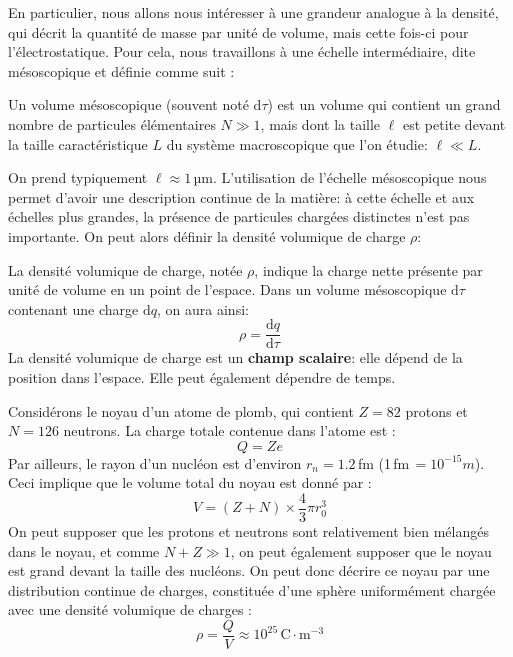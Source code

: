 \documentclass[11pt,fleqn]{book} %
\begin{document}
En particulier, nous allons nous intéresser à une grandeur analogue à la densité, qui décrit la quantité de masse par unité de volume, mais cette fois-ci pour l'électrostatique. Pour cela, nous travaillons à une échelle intermédiaire, dite mésoscopique et définie comme suit :

\begin{definition}
    Un volume mésoscopique (souvent noté $\mathrm{d}\tau$) est un volume qui contient un grand nombre de particules élémentaires $N \gg 1$, mais dont la taille $\ell$ est petite devant la taille caractéristique $L$ du système macroscopique que l'on étudie: $\ell \ll L$. 
\end{definition}

On prend typiquement $\ell \approx 1$\,µm. L'utilisation de l'échelle mésoscopique nous permet d'avoir une description continue de la matière: à cette échelle et aux échelles plus grandes, la présence de particules chargées distinctes n'est pas importante. On peut alors définir la densité volumique de charge $\rho$:

\begin{definition}
    La densité volumique de charge, notée $\rho$, indique la charge nette présente par unité de volume en un point de l'espace. Dans un volume mésoscopique $\mathrm{d}\tau$ contenant une charge $\mathrm{d} q$, on aura ainsi:
    \begin{equation}
        \rho = \frac{\mathrm{d} q}{\mathrm{d}\tau}
    \end{equation}
    La densité volumique de charge est un \textbf{champ scalaire}: elle dépend de la position dans l'espace. Elle peut également dépendre de temps.
\end{definition}

\begin{example}
    Considérons le noyau d'un atome de plomb, qui contient $Z = 82$ protons et $N = 126$ neutrons. La charge totale contenue dans l'atome est :
    \begin{equation}
        Q = Z e
    \end{equation}
    Par ailleurs, le rayon d'un nucléon est d'environ $r_n = 1.2$\,fm (1\,fm\,$=10^{-15}m$). Ceci implique que le volume total du noyau est donné par :
    \begin{equation}
        V = (Z+N) \times \frac{4}{3} \pi r_0^3
    \end{equation}
    On peut supposer que les protons et neutrons sont relativement bien mélangés dans le noyau, et comme $N+Z \gg 1$, on peut également supposer que le noyau est grand devant la taille des nucléons. On peut donc décrire ce noyau par une distribution continue de charges, constituée d'une sphère uniformément chargée avec une densité volumique de charges :
    \begin{equation}
        \rho = \frac{Q}{V} \approx 10^{25} \,\mathrm{C} \cdot \mathrm{m}^{-3}
    \end{equation}
\end{example}
\end{document}

